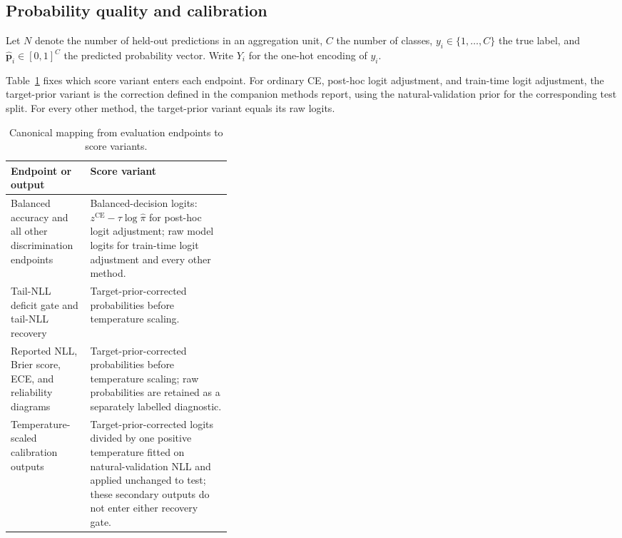 \documentclass[11pt]{article}
\begin{document}
\subsection{Probability quality and calibration}
Let $N$ denote the number of held-out predictions in an aggregation unit, $C$ the number of classes, $y_i\in\{1,\ldots,C\}$ the true label, and $\hat{\mathbf{p}}_i\in[0,1]^C$ the predicted probability vector. Write $Y_i$ for the one-hot encoding of $y_i$.

Table~\ref{tab:score-variants} fixes which score variant enters each endpoint. For ordinary CE,
post-hoc logit adjustment, and train-time logit adjustment, the target-prior variant is the
correction defined in the companion methods report, using the natural-validation prior for the
corresponding test split. For every other method, the target-prior variant equals its raw logits.

\begin{table}[ht]
  \centering
  \small
  \begin{tabularx}{\linewidth}{@{}p{0.36\linewidth}X@{}}
    \toprule
    Endpoint or output & Score variant \\
    \midrule
    Balanced accuracy and all other discrimination endpoints
      & Balanced-decision logits: $z^{\mathrm{CE}}-\tau\log\widehat\pi$ for post-hoc logit adjustment; raw model logits for train-time logit adjustment and every other method. \\
    Tail-NLL deficit gate and tail-NLL recovery
      & Target-prior-corrected probabilities before temperature scaling. \\
    Reported NLL, Brier score, ECE, and reliability diagrams
      & Target-prior-corrected probabilities before temperature scaling; raw probabilities are retained as a separately labelled diagnostic. \\
    Temperature-scaled calibration outputs
      & Target-prior-corrected logits divided by one positive temperature fitted on natural-validation NLL and applied unchanged to test; these secondary outputs do not enter either recovery gate. \\
    \bottomrule
  \end{tabularx}
  \caption{Canonical mapping from evaluation endpoints to score variants.}
  \label{tab:score-variants}
\end{table}
\end{document}
